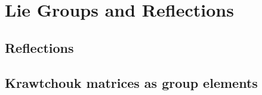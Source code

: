 \chapter{Lie Groups and Reflections}
\label{ch:7}
\section{Reflections}
\label{sec:7-1}

\section{Krawtchouk matrices as group elements}
\label{sec:7-2}

